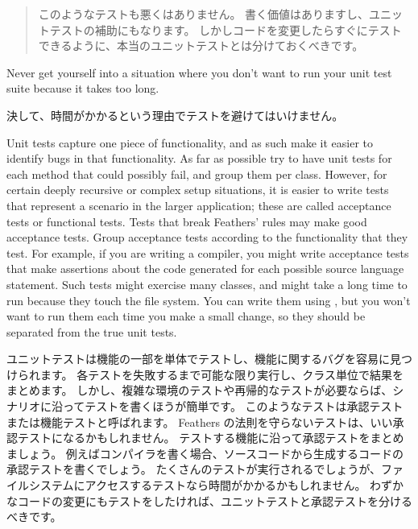 \documentclass[a4paper,10pt,twoside]{book}
\begin{document}
{\begin{description}
\begin{quotation}
{このようなテストも悪くはありません。
書く価値はありますし、ユニットテストの補助にもなります。
しかしコードを変更したらすぐにテストできるように、本当のユニットテストとは分けておくべきです。

 }
  \end{quotation}

Never get yourself into a situation where you don't want to run your unit test suite because it takes too long.   
\fi

決して、時間がかかるという理由でテストを避けてはいけません。

 \item[Unit Tests \textit{vs.}\ Acceptance Tests.] Unit tests capture one piece of
  functionality, and as such make it easier to identify bugs in that functionality.
  As far as
  possible try to have unit tests for each method that could possibly fail, and group them per class.
  However,
  for certain deeply recursive or complex setup situations, it is
  easier to write tests that represent a scenario in the larger application; these are called acceptance 
  tests or functional tests.
  Tests that break Feathers' rules may make good acceptance tests.
  Group acceptance tests according to the functionality that they test.
  For example, if you are writing a compiler, you might write acceptance tests that make 
  assertions about the code generated for each possible source language statement.
  Such tests might exercise many classes, and might take a long time to run because they touch the 
  file system.
  You can write them using \sunit, but you won't want to run them each time you make a small change,
  so they should be separated from the true unit tests.
\fi
 
 \item[ユニットテスト \textit{vs.}\ 承認テスト。] ユニットテストは機能の一部を単体でテストし、機能に関するバグを容易に見つけられます。
  各テストを失敗するまで可能な限り実行し、クラス単位で結果をまとめます。
  しかし、複雑な環境のテストや再帰的なテストが必要ならば、シナリオに沿ってテストを書くほうが簡単です。
  このようなテストは承認テストまたは機能テストと呼ばれます。
  Feathers の法則を守らないテストは、いい承認テストになるかもしれません。
  テストする機能に沿って承認テストをまとめましょう。
  例えばコンパイラを書く場合、ソースコードから生成するコードの承認テストを書くでしょう。
  たくさんのテストが実行されるでしょうが、ファイルシステムにアクセスするテストなら時間がかかるかもしれません。
  わずかなコードの変更にもテストをしたければ、ユニットテストと承認テストを分けるべきです。


\end{description}}
\end{document}
